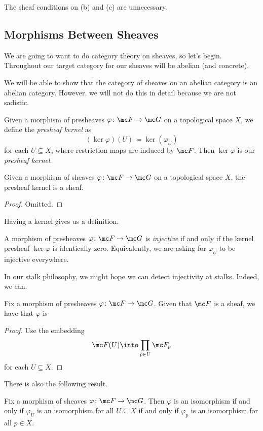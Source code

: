 \documentclass[../notes.tex]{subfiles}
\begin{document}
\begin{remark}
	The sheaf conditions on (b) and (c) are unnecessary.
\end{remark}

\subsection{Morphisms Between Sheaves}
We are going to want to do category theory on sheaves, so let's begin. Throughout our target category for our sheaves will be abelian (and concrete).
\begin{remark}
	We will be able to show that the category of sheaves on an abelian category is an abelian category. However, we will not do this in detail because we are not sadistic.
\end{remark}
\begin{definition}
	Given a morphism of presheaves $\varphi\colon\mc F\to\mc G$ on a topological space $X$, we define the \textit{presheaf kernel} as
	\[(\ker\varphi)(U)\coloneqq\ker(\varphi_U)\]
	for each $U\subseteq X$, where restriction maps are induced by $\mc F$. Then $\ker\varphi$ is our \textit{presheaf kernel}.
\end{definition}
\begin{lemma}
	Given a morphism of sheaves $\varphi\colon\mc F\to\mc G$ on a topological space $X$, the presheaf kernel is a sheaf.
\end{lemma}
\begin{proof}
	Omitted.
\end{proof}
Having a kernel gives us a definition.
\begin{definition}[Injective]
	A morphism of presheaves $\varphi\colon\mc F\to\mc G$ is \textit{injective} if and only if the kernel presheaf $\ker\varphi$ is identically zero. Equivalently, we are asking for $\varphi_U$ to be injective everywhere.
\end{definition}
In our stalk philosophy, we might hope we can detect injectivity at stalks. Indeed, we can.
\begin{proposition}
	Fix a morphism of presheaves $\varphi\colon\mc F\to\mc G$. Given that $\mc F$ is a sheaf, we have that $\varphi$ is 
\end{proposition}
\begin{proof}
	Use the embedding
	\[\mc F(U)\into\prod_{p\in U}\mc F_p\]
	for each $U\subseteq X$.
\end{proof}
There is also the following result.
\begin{proposition}
	Fix a morphism of sheaves $\varphi\colon\mc F\to\mc G$. Then $\varphi$ is an isomorphism if and only if $\varphi_U$ is an isomorphism for all $U\subseteq X$ if and only if $\varphi_p$ is an isomorphism for all $p\in X$.
\end{proposition}
\end{document}
